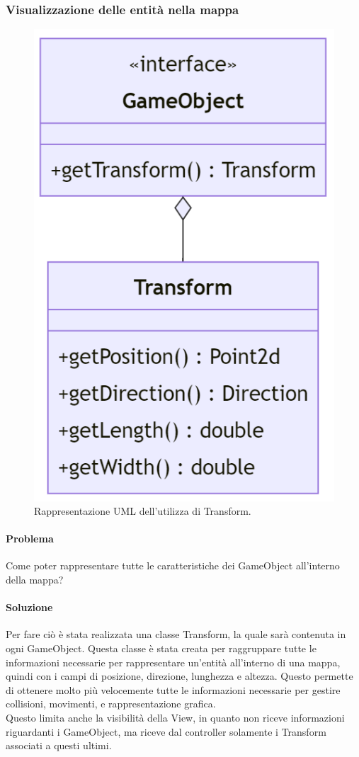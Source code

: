 \documentclass[a4paper,12pt]{report}
\begin{document}
\subsubsection*{Visualizzazione delle entità nella mappa}
%
\begin{figure}[H]
	\centering{}
	\includegraphics[scale=0.6]{img/transform.png}
	\caption{Rappresentazione UML dell'utilizza di Transform.}
	\label{img:strategy}
	\end{figure}
%
\paragraph*{Problema} Come poter rappresentare tutte le caratteristiche dei GameObject all’interno della mappa?
%
\paragraph*{Soluzione} Per fare ciò è stata realizzata una classe Transform, la quale sarà contenuta in ogni GameObject. Questa classe è stata creata per raggruppare tutte le informazioni necessarie per rappresentare un’entità all’interno di una mappa, quindi con i campi di posizione, direzione, lunghezza e altezza. Questo permette di ottenere molto più velocemente tutte le informazioni necessarie per gestire collisioni, movimenti, e rappresentazione grafica.\\
Questo limita anche la visibilità della View, in quanto non riceve informazioni riguardanti i GameObject, ma riceve dal controller solamente i Transform associati a questi ultimi.
\newpage
\end{document}

